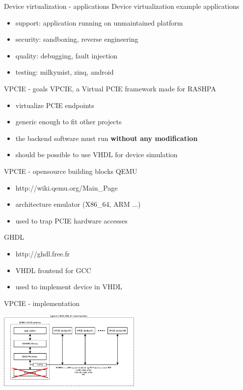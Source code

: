 \documentclass{beamer}
\begin{document}
\begin{frame}{Device virtualization - applications}
  Device virtualization example applications
  \begin{itemize}
  \item support: application running on unmaintained platform
  \item security: sandboxing, reverse engineering
  \item quality: debugging, fault injection
  \item testing: milkymist, zinq, android
  \end{itemize}
\end{frame}

\begin{frame}{VPCIE - goals}
  VPCIE, a Virtual PCIE framework made for RASHPA
  \begin{itemize}
  \item virtualize PCIE endpoints
  \item generic enough to fit other projects
  \item the backend software must run \textbf{without any modification}
  \item should be possible to use VHDL for device simulation
  \end{itemize}
\end{frame}

\begin{frame}{VPCIE - opensource building blocks}
  QEMU 
  \begin{itemize}
  \item http://wiki.qemu.org/Main\_Page
  \item architecture emulator (X86\_64, ARM ...)
  \item used to trap PCIE hardware accesses
  \end{itemize}
  GHDL
  \begin{itemize}
  \item http://ghdl.free.fr
  \item VHDL frontend for GCC
  \item used to implement device in VHDL
  \end{itemize}
\end{frame}

\begin{frame}{VPCIE - implementation}
  \begin{center}
  \includegraphics[width=70mm]{pic/dv_implem/main.jpeg}
  \end{center}
\end{frame}
\end{document}
